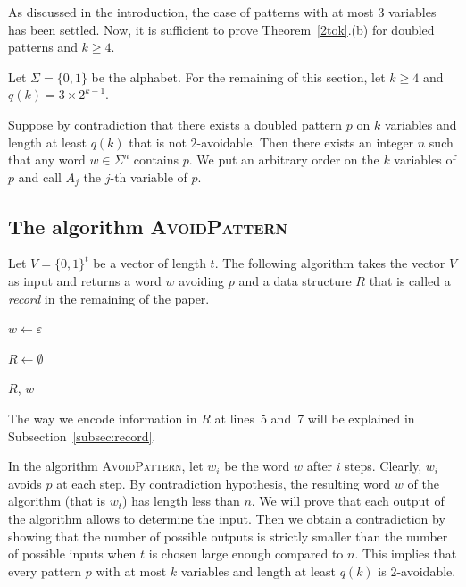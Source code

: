 \documentclass[]{elsart}
\newcommand{\set}[1]{\{#1\}}
\newcommand{\ap}{\textsc{AvoidPattern}\xspace}
\begin{document}
As discussed in the introduction, the case of patterns with at most
$3$ variables has been settled. Now, it is sufficient to prove
Theorem~\ref{2tok}.(b) for doubled patterns and $k\ge 4$. 

Let $\Sigma=\set{0,1}$ be the alphabet. For the remaining of this
section, let $k\ge 4$ and $q(k)=3\times 2^{k-1}$.

Suppose by contradiction that there exists a doubled pattern $p$ on $k$
variables and length at least $q(k)$ that is not $2$-avoidable.
Then there exists an integer $n$ such that any word $w\in\Sigma^n$ contains $p$.
We put an arbitrary order on the $k$ variables of $p$ and call $A_j$ the $j$-th variable of $p$.

\subsection{The algorithm \ap}

Let $V=\set{0,1}^t$ be a vector of length $t$. 
The following algorithm takes the vector $V$
as input and returns a word $w$ avoiding $p$ and a data structure $R$
that is called a \emph{record} in the remaining of the paper.

\begin{algorithm}[H]
\DontPrintSemicolon
\LinesNumbered


  $w\gets \varepsilon$ 

  $R\gets \emptyset$
  
  \Return $R$, $w$
  \caption{\ap\label{algo:ap}}
\end{algorithm}

The way we encode information in $R$ at lines~5
and~7 will be explained in Subsection~\ref{subsec:record}.

In the algorithm \ap, let $w_i$ be the word $w$ after $i$ steps.
Clearly, $w_i$ avoids $p$ at each step. By contradiction hypothesis,
the resulting word $w$ of the algorithm (that is $w_t$) has length less than $n$.
We will prove that each output of the algorithm allows to determine the input.
Then we obtain a contradiction by showing that the number of possible outputs
is strictly smaller than the number of possible inputs
when $t$ is chosen large enough compared to $n$.
This implies that every pattern $p$ with at most $k$ variables and length at least
$q(k)$ is $2$-avoidable.
\end{document}
